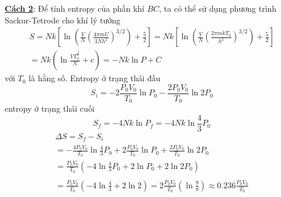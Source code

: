 \noindent\underline{\textbf{Cách 2}}: Để tính entropy của phần khí $BC$, ta có thể sử dụng phương trình Sackur-Tetrode cho khí lý tưởng
\begin{equation*}
  \begin{gathered}
    S=Nk\left[\ln\left(\frac{V}{N}\left(\frac{4\pi mU}{3Nh^{2}}\right)^{3/2}\right)+\frac{5}{2}\right]=Nk\left[\ln\left(\frac{V}{N}\left(\frac{2\pi mkT_{0}}{h^{2}}\right)^{3/2}\right)+\frac{5}{2}\right]\\
    =Nk\left(\ln\frac{VT_{0}^{\frac{3}{2}}}{N}+c\right)=-Nk\ln P+C
  \end{gathered}
\end{equation*}
với $T_0$ là hằng số. Entropy ở trạng thái đầu
\begin{equation*}
  S_{i}=-2\frac{P_{0}V_{0}}{T_{0}}\ln P_{0}-\frac{2P_{0}V_{0}}{T_{0}}\ln2P_{0}
\end{equation*}
entropy ở trạng thái cuối
\begin{equation*}
  S_{f}=-4Nk\ln P_{f}=-4Nk\ln\frac{4}{3}P_{0}
\end{equation*}
\begin{equation*}
  \begin{gathered}
    \Delta S=S_{f}-S_{i}\\
    =  -\frac{4P_{0}V_{0}}{T_{0}}\ln\frac{4}{3}P_{0}+2\frac{P_{0}V_{0}}{T_{0}}\ln P_{0}+\frac{2P_{0}V_{0}}{T_{0}}\ln2P_{0}\\
    =\frac{P_{0}V_{0}}{T_{0}}\left(-4\ln\frac{4}{3}P_{0}+2\ln P_{0}+2\ln2P_{0}\right) \\
    \\=\frac{P_{0}V_{0}}{T_{0}}\left(-4\ln\frac{4}{3}+2\ln2\right)=2\frac{P_{0}V_{0}}{T_{0}}\left(\ln\frac{9}{8}\right)\approx0.236\frac{P_{0}V_{0}}{T_{0}}
  \end{gathered}
\end{equation*}